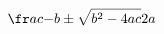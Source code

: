 \documentclass[preview]{standalone}
\begin{document}
\begin{align*}
\fr a c { - b   \pm   \sqrt { b ^ 2   -   4 a c }}{ 2 a }
\end{align*}
\end{document}
